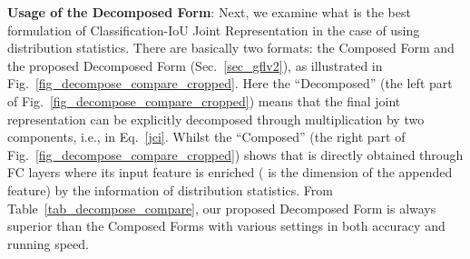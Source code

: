 \documentclass[10pt,twocolumn,letterpaper]{article}
\begin{document}
\noindent \textbf{Usage of the Decomposed Form}: Next, we examine what is the best formulation of Classification-IoU Joint Representation in the case of using distribution statistics. There are basically two formats: the Composed Form and the proposed Decomposed Form (Sec.~\ref{sec_gflv2}), as illustrated in Fig.~\ref{fig_decompose_compare_cropped}. Here the ``Decomposed'' (the left part of Fig.~\ref{fig_decompose_compare_cropped}) means that the final joint representation can be explicitly decomposed through multiplication by two components, i.e.,  in Eq.~\eqref{jci}. Whilst the ``Composed'' (the right part of Fig.~\ref{fig_decompose_compare_cropped}) shows that  is directly obtained through FC layers where its input feature is enriched ( is the dimension of the appended feature) by the information of distribution statistics. From Table~\ref{tab_decompose_compare}, our proposed Decomposed Form is always superior than the Composed Forms with various  settings in both accuracy and running speed. 



\begin{table}[t]
\small
	\centering
	\renewcommand\arraystretch{1.1}
	\newcommand{\tabincell}[2]{\begin{tabular}{@{}#1@{}}#2\end{tabular}}
	
	\vspace{-8pt}
	\caption{Comparisons between Decomposed Form (proposed) and Composed Form (with various dimension  settings).}
	\vspace{-6pt}
	\label{tab_decompose_compare}
\end{table}
\end{document}
